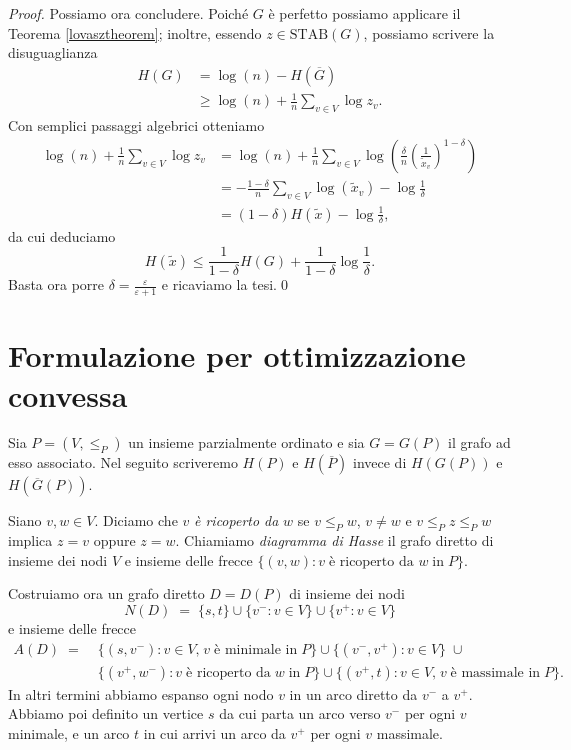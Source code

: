 \begin{proof}
  Possiamo ora concludere. Poiché \(G\) è perfetto possiamo applicare il Teorema \ref{lovasztheorem}; inoltre, essendo \(z\in\text{STAB}(G)\), possiamo scrivere la disuguaglianza 
  \begin{align}
    H(G)&=\log(n)-H(\overline{G}) \nonumber \\
    &\ge \log(n) + \frac{1}{n}\sum_{v\in V}{\log{z_v}}.\nonumber 
  \end{align}
  Con semplici passaggi algebrici otteniamo 
  \begin{align}
    \log(n) + \frac{1}{n}\sum_{v\in V}{\log{z_v}} &= \log(n) + \frac{1}{n}\sum_{v\in V}{\log\left(\frac{\delta}{n}\left(\frac{1}{\tilde{x}_v}\right)^{1-\delta}\right)} \nonumber \\
    &= - \frac{1-\delta}{n}\sum_{v\in V}{\log(\tilde{x}_v)}-\log{\frac{1}{\delta}} \nonumber \\
    &= (1-\delta)H(\tilde{x})-\log{\frac{1}{\delta}} \nonumber, 
  \end{align}
  da cui deduciamo
  \[H(\tilde{x})\le\frac{1}{1-\delta}H(G)+\frac{1}{1-\delta}\log{\frac{1}{\delta}}.\]
  Basta ora porre \(\delta=\frac{\varepsilon}{\varepsilon+1}\) e ricaviamo la tesi.\qed
\end{proof}

\section{Formulazione per ottimizzazione convessa}

Sia \(P=(V, \le_{P})\) un insieme parzialmente ordinato e sia \(G=G(P)\) il grafo ad esso associato. Nel seguito scriveremo \(H(P)\) e \(H(\overline{P})\) invece di \(H(G(P))\) e \(H(\overline{G}(P))\).

Siano \(v,w\in V\). Diciamo che \(v\) \emph{è ricoperto da} \(w\) se \(v\le_{P} w\), \(v\neq w\) e \(v\le_{P}z\le_{P}w\) implica \(z=v\) oppure \(z=w\). Chiamiamo \emph{diagramma di Hasse} il grafo diretto di insieme dei nodi \(V\) e insieme delle frecce \(\{(v,w):v\;\text{è ricoperto da }w\;\text{in}\;P\}\).

Costruiamo ora un grafo diretto \(D=D(P)\) di insieme dei nodi
\[
N(D)\;=\;\{s,t\}\cup\{v^-:v\in V\}\cup\{v^+:v\in V\}
\]
e insieme delle frecce
\begin{align}
  A(D)\;=\;&\{(s,v^-):v\in V\text{,}\;v\;\text{è minimale in}\; P\}\cup\{(v^-,v^+):v\in V\}\;\cup \nonumber \\
  &\{(v^+,w^-):v\;\text{è ricoperto da}\;w\;\text{in}\;P\}\cup\{(v^+,t):v\in V\text{,}\;v\;\text{è massimale in}\;P\}\text{.} \nonumber
\end{align}
In altri termini abbiamo espanso ogni nodo \(v\) in un arco diretto da \(v^-\) a \(v^+\). Abbiamo poi definito un vertice \(s\) da cui parta un arco verso \(v^-\) per ogni \(v\)  minimale, e un arco \(t\) in cui arrivi un arco da \(v^+\) per ogni \(v\) massimale.

